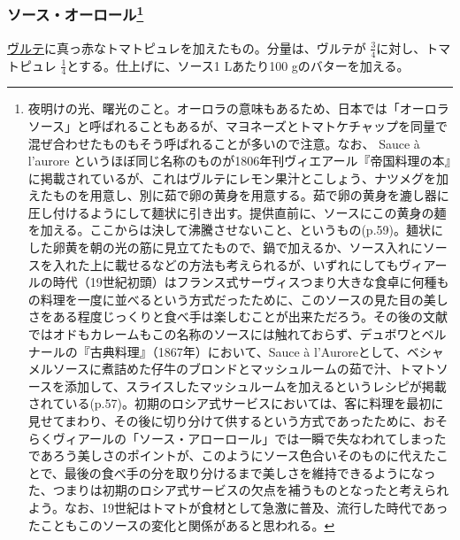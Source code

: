 \begin{recette}
{\subsubsection[ソース・オーロール]{\texorpdfstring{ソース・オーロール\footnote{夜明けの光、曙光のこと。オーロラの意味もあるため、日本では「オーロラソース」と呼ばれることもあるが、マヨネーズとトマトケチャップを同量で混ぜ合わせたものもそう呼ばれることが多いので注意。なお、
  Sauce à l'aurore
  というほぼ同じ名称のものが1806年刊ヴィエアール『帝国料理の本』に掲載されているが、これはヴルテにレモン果汁とこしょう、ナツメグを加えたものを用意し、別に茹で卵の黄身を用意する。茹で卵の黄身を漉し器に圧し付けるようにして麺状に引き出す。提供直前に、ソースにこの黄身の麺を加える。ここからは決して沸騰させないこと、というもの(p.59)。麺状にした卵黄を朝の光の筋に見立てたもので、鍋で加えるか、ソース入れにソースを入れた上に載せるなどの方法も考えられるが、いずれにしてもヴィアールの時代（19世紀初頭）はフランス式サーヴィスつまり大きな食卓に何種もの料理を一度に並べるという方式だったために、このソースの見た目の美しさをある程度じっくりと食べ手は楽しむことが出来ただろう。その後の文献ではオドもカレームもこの名称のソースには触れておらず、デュボワとベルナールの『古典料理』（1867年）において、Sauce
  à
  l'Auroreとして、ベシャメルソースに煮詰めた仔牛のブロンドとマッシュルームの茹で汁、トマトソースを添加して、スライスしたマッシュルームを加えるというレシピが掲載されている(p.57)。初期のロシア式サービスにおいては、客に料理を最初に見せてまわり、その後に切り分けて供するという方式であったために、おそらくヴィアールの「ソース・アローロール」では一瞬で失なわれてしまったであろう美しさのポイントが、このようにソース色合いそのものに代えたことで、最後の食べ手の分を取り分けるまで美しさを維持できるようになった、つまりは初期のロシア式サービスの欠点を補うものとなったと考えられよう。なお、19世紀はトマトが食材として急激に普及、流行した時代であったこともこのソースの変化と関係があると思われる。}}{ソース・オーロール}}\label{sauce-aurore}}



\protect\hyperlink{veloute}{ヴルテ}に真っ赤なトマトピュレを加えたもの。分量は、ヴルテが
\(\frac{3}{4}\)に対し、トマトピュレ
\(\frac{1}{4}\)とする。仕上げに、ソース1 Lあたり100 gのバターを加える。


\end{recette}
